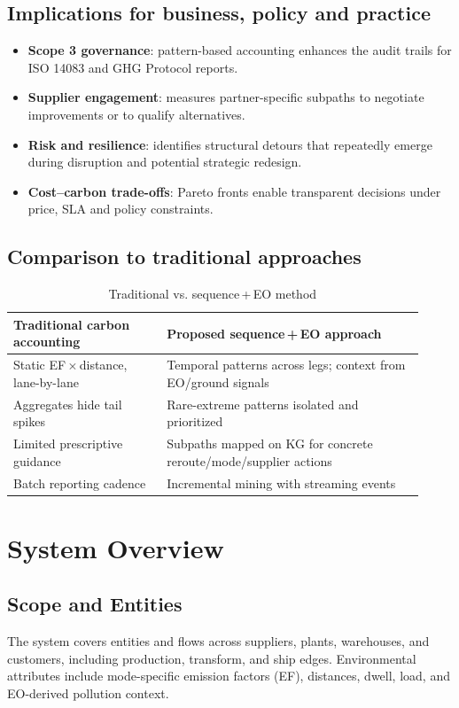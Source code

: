 \documentclass[conference]{IEEEtran}
\begin{document}
\subsection{Implications for business, policy and practice}
\begin{itemize}
  \item \textbf{Scope 3 governance}: pattern-based accounting enhances the audit trails for ISO 14083 and GHG Protocol reports.
  \item \textbf{Supplier engagement}: measures partner-specific subpaths to negotiate improvements or to qualify alternatives.
  \item \textbf{Risk and resilience}: identifies structural detours that repeatedly emerge during disruption and potential strategic redesign.
  \item \textbf{Cost--carbon trade-offs}: Pareto fronts enable transparent decisions under price, SLA and policy constraints.
\end{itemize}

\subsection{Comparison to traditional approaches}
\begin{table}[!t]
\centering
\caption{Traditional vs. sequence\,+\,EO method}
\begin{tabular}{@{}p{0.34\linewidth}p{0.58\linewidth}@{}}
\toprule
\textbf{Traditional carbon accounting} & \textbf{Proposed sequence\,+\,EO approach} \\
\midrule
Static EF\,$\times$\,distance, lane-by-lane & Temporal patterns across legs; context from EO/ground signals \\
Aggregates hide tail spikes & Rare-extreme patterns isolated and prioritized \\
Limited prescriptive guidance & Subpaths mapped on KG for concrete reroute/mode/sup\-plier actions \\
Batch reporting cadence & Incremental mining with streaming events \\
\bottomrule
\end{tabular}
\label{tab:compare}
\end{table}

\section{System Overview}
\subsection{Scope and Entities}
The system covers entities and flows across suppliers, plants, warehouses, and customers, including production, transform, and ship edges. Environmental attributes include mode-specific emission factors (EF), distances, dwell, load, and EO-derived pollution context.
\end{document}
